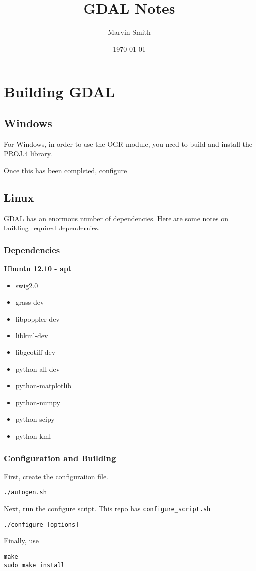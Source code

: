 \documentclass[12pt]{report}
\title{GDAL Notes}
\author{Marvin Smith}
\date{\today}
\begin{document}
\section*{Building GDAL}

\subsection*{Windows}
For Windows, in order to use the OGR module, you need to build and install
the PROJ.4 library.  

Once this has been completed, configure  


\subsection*{Linux}
GDAL has an enormous number of dependencies. Here are some notes on building required
dependencies.

\subsubsection*{Dependencies}

\noindent\textbf{Ubuntu 12.10 - apt}
\begin{itemize}
\item swig2.0
\item grass-dev
\item libpoppler-dev
\item libkml-dev
\item libgeotiff-dev
\item python-all-dev
\item python-matplotlib
\item python-numpy
\item python-scipy
\item python-kml
\end{itemize}


\subsubsection*{Configuration and Building}

First, create the configuration file.
\begin{verbatim}
./autogen.sh
\end{verbatim}

Next, run the configure script.  This repo has \verb+configure_script.sh+
\begin{verbatim}
./configure [options]
\end{verbatim}

Finally, use
\begin{verbatim}
make
sudo make install
\end{verbatim}
\end{document}
